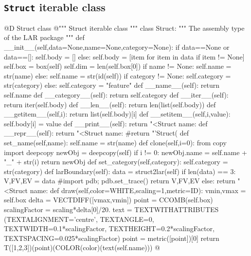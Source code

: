 \documentclass[11pt,oneside]{article}    %
\begin{document}
\subsection{\texttt{Struct} iterable class}
@D Struct class
@{""" Struct iterable class """
class Struct:
    """ The assembly type of the LAR package """
    def __init__(self,data=None,name=None,category=None):
        if data==None or data==[]:
            self.body = []
        else:
            self.body = [item for item in data if item != None]
            self.box = box(self) 
            self.dim = len(self.box[0])
        if name != None: 
            self.name = str(name)
        else:
            self.name = str(id(self))
        if category != None: 
            self.category = str(category)
        else:
            self.category = "feature"
    def __name__(self):
        return self.name
    def __category__(self):
        return self.category
    def __iter__(self):
        return iter(self.body)
    def __len__(self):
        return len(list(self.body))
    def __getitem__(self,i):
        return list(self.body)[i]
    def __setitem__(self,i,value):
        self.body[i] = value
    def __print__(self): 
        return "<Struct name: %
    def __repr__(self):
        return "<Struct name: %
        #return "'Struct(%
    def set_name(self,name):
        self.name = str(name)
    def clone(self,i=0):
        from copy import deepcopy
        newObj = deepcopy(self)
        if i != 0: newObj.name = self.name + "_" + str(i)
        return newObj
    def set_category(self,category):
        self.category = str(category)
    def larBoundary(self):
        data = struct2lar(self)
        if len(data) == 3:
            V,FV,EV = data
            #import pdb; pdb.set_trace()
            return V,FV,EV
        else:
            return "<Struct name: %
    def draw(self,color=WHITE,scaling=1,metric=ID):
        vmin,vmax = self.box
        delta = VECTDIFF([vmax,vmin])
        point = CCOMB(self.box)
        scalingFactor = scaling*delta[0]/20.
        text = TEXTWITHATTRIBUTES (TEXTALIGNMENT='centre', TEXTANGLE=0,
                    TEXTWIDTH=0.1*scalingFactor, 
                    TEXTHEIGHT=0.2*scalingFactor,
                    TEXTSPACING=0.025*scalingFactor)
        point = metric([point])[0]
        return T([1,2,3])(point)(COLOR(color)(text(self.name)))
@}
\end{document}
